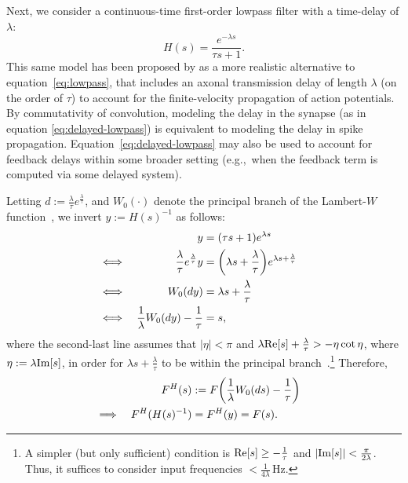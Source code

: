 \documentclass[12pt]{article}
\theoremstyle{definition}
\let\originalleft\left
\let\originalright\right
\renewcommand{\left}{\mathopen{}\mathclose\bgroup\originalleft}
\renewcommand{\right}{\aftergroup\egroup\originalright}
\begin{document}
Next, we consider a continuous-time first-order lowpass filter with a time-delay of $\lambda$:
\begin{equation} \label{eq:delayed-lowpass}
H(s) = \frac{e^{-\lambda s}}{\tau s + 1} \text{.}
\end{equation}
This same model has been proposed by \citet[][equation~6.2]{roth2009modeling} as a more realistic alternative to equation~\ref{eq:lowpass}, that includes an axonal transmission delay of length $\lambda$ (on the order of $\tau$) to account for the finite-velocity propagation of action potentials.
By commutativity of convolution, modeling the delay in the synapse (as in equation \ref{eq:delayed-lowpass}) is equivalent to modeling the delay in spike propagation.
Equation~\ref{eq:delayed-lowpass} may also be used to account for feedback delays within some broader setting (e.g.,~when the feedback term is computed via some delayed system).

Letting $d := \frac{\lambda}{\tau}e^{\frac{\lambda}{\tau}}$, and $W_0(\cdot)$ denote the principal branch of the Lambert-$W$ function~\citep{corless1996lambertw}, we invert $y := H(s)^{-1}$ as follows:
\begin{align*}
&& y &= \left(\tau s + 1\right) e^{\lambda s} && \\
\iff && \frac{\lambda}{\tau}e^{\frac{\lambda}{\tau}} y &= \left( \lambda s + \frac{\lambda}{\tau} \right) e^{\lambda s + \frac{\lambda}{\tau}} && \\
\iff && W_0(dy) &= \lambda s + \frac{\lambda}{\tau} && \\
\iff && \frac{1}{\lambda} W_0(dy) - \frac{1}{\tau} &= s \text{,} &&
\end{align*}
where the second-last line assumes that $|\eta| < \pi$ and $\lambda \text{Re}\left[ s \right] + \frac{\lambda}{\tau} > - \eta \cot \eta$, where $\eta := \lambda \text{Im}\left[ s \right]$, in order for $\lambda s + \frac{\lambda}{\tau}$ to be within the principal branch~\citep[][equation~4.4]{corless1996lambertw}.\footnote{
A simpler (but only sufficient) condition is $\text{Re} \left[ s \right] \ge -\frac{1}{\tau}$ and $ | \text{Im} \left[ s \right] | < \frac{\pi}{2 \lambda}$.
Thus, it suffices to consider input frequencies $< \frac{1}{4\lambda}$\,Hz.}
Therefore,
\begin{align}
&& F^H(s) &:= F\left( \frac{1}{\lambda} W_0(ds) - \frac{1}{\tau} \right) \label{eq:delayed-lowpass-mapped} && \\
\implies && F^H(H(s)^{-1}) &= F^H(y) = F(s) \text{.} && \nonumber
\end{align}
\end{document}
